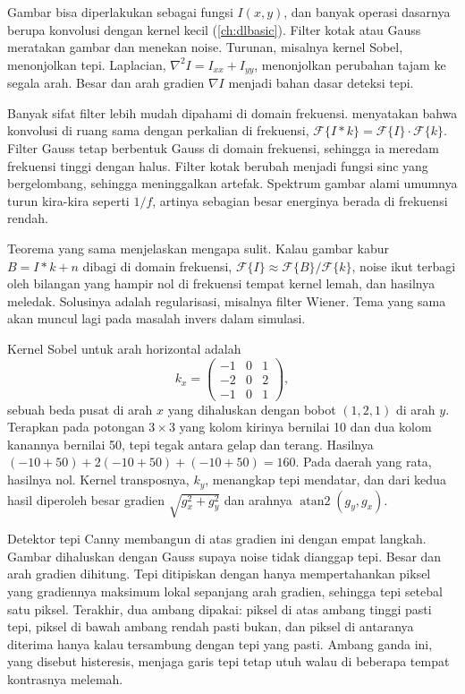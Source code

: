 Gambar bisa diperlakukan sebagai fungsi $I(x,y)$, dan banyak operasi dasarnya berupa konvolusi
dengan kernel kecil (\cref{ch:dlbasic}). Filter kotak atau Gauss meratakan gambar dan menekan
noise. Turunan, misalnya kernel Sobel, menonjolkan tepi. Laplacian, $\nabla^2I=I_{xx}+I_{yy}$,
menonjolkan perubahan tajam ke segala arah. Besar dan arah gradien $\nabla I$ menjadi bahan
dasar deteksi tepi.

Banyak sifat filter lebih mudah dipahami di domain frekuensi. 
menyatakan bahwa konvolusi di ruang sama dengan perkalian di frekuensi,
$\mathcal F\{I\ast k\}=\mathcal F\{I\}\cdot\mathcal F\{k\}$. Filter Gauss tetap berbentuk Gauss di
domain frekuensi, sehingga ia meredam frekuensi tinggi dengan halus. Filter kotak berubah menjadi
fungsi sinc yang bergelombang, sehingga meninggalkan artefak. Spektrum gambar alami umumnya
turun kira-kira seperti $1/f$, artinya sebagian besar energinya berada di frekuensi rendah.

Teorema yang sama menjelaskan mengapa  sulit. Kalau gambar kabur
$B=I\ast k+n$ dibagi di domain frekuensi, $\mathcal F\{I\}\approx\mathcal F\{B\}/\mathcal F\{k\}$,
noise ikut terbagi oleh bilangan yang hampir nol di frekuensi tempat kernel lemah, dan
hasilnya meledak. Solusinya adalah regularisasi, misalnya filter Wiener. Tema yang sama akan
muncul lagi pada masalah invers dalam simulasi.

Kernel Sobel untuk arah horizontal adalah
\begin{equation}
k_x=\begin{pmatrix}-1&0&1\\-2&0&2\\-1&0&1\end{pmatrix},
\end{equation}
sebuah beda pusat di arah $x$ yang dihaluskan dengan bobot $(1,2,1)$ di arah $y$. Terapkan pada potongan $3\times3$ yang
kolom kirinya bernilai 10 dan dua kolom kanannya bernilai 50, tepi tegak antara gelap dan terang. Hasilnya
$(-10+50)+2(-10+50)+(-10+50)=160$. Pada daerah yang rata, hasilnya nol. Kernel transposnya, $k_y$, menangkap tepi mendatar,
dan dari kedua hasil diperoleh besar gradien $\sqrt{g_x^2+g_y^2}$ dan arahnya $\operatorname{atan2}(g_y,g_x)$.

Detektor tepi Canny \citep{canny1986} membangun di atas gradien ini dengan empat langkah. Gambar dihaluskan dengan Gauss
supaya noise tidak dianggap tepi. Besar dan arah gradien dihitung. Tepi ditipiskan dengan hanya mempertahankan piksel yang
gradiennya maksimum lokal sepanjang arah gradien, sehingga tepi setebal satu piksel. Terakhir, dua ambang dipakai: piksel
di atas ambang tinggi pasti tepi, piksel di bawah ambang rendah pasti bukan, dan piksel di antaranya diterima hanya kalau
tersambung dengan tepi yang pasti. Ambang ganda ini, yang disebut histeresis, menjaga garis tepi tetap utuh walau di beberapa
tempat kontrasnya melemah.

